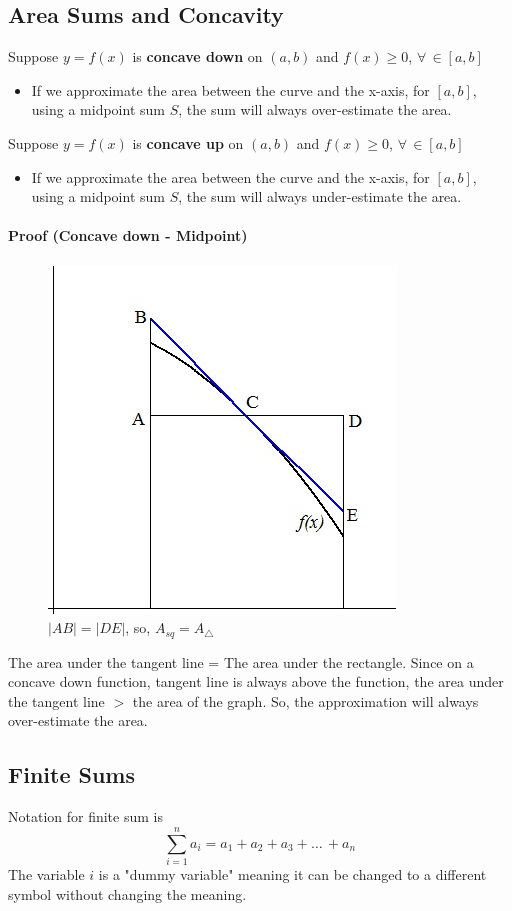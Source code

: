 \documentclass[12pt]{article}
\begin{document}
\subsection{Area Sums and Concavity}
Suppose $y = f(x)$ is \textbf{concave down} on $(a, b)$ and $f(x) \geq 0$, $\forall \, \in [a, b]$
\begin{itemize} 
    \item If we approximate the area between the curve and the x-axis, for $[a, b]$, using a midpoint sum $S$, 
    the sum will always over-estimate the area.
\end{itemize}

\noindent
Suppose $y = f(x)$ is \textbf{concave up} on $(a, b)$ and $f(x) \geq 0$, $\forall \, \in [a, b]$
\begin{itemize} 
    \item If we approximate the area between the curve and the x-axis, for $[a, b]$, using a midpoint sum  $S$, 
    the sum will always under-estimate the area.
\end{itemize}

\paragraph{Proof (Concave down - Midpoint)}
\begin{figure}[h!]
    \centering
    \includegraphics[width = 0.32\linewidth]{Images/overestimate concave down.jpg}
    \caption{$|AB| = |DE|$, so, $A_{sq} = A_{\triangle}$}
\end{figure}
The area under the tangent line = The area under the rectangle. Since on a concave down function, tangent line is always above the function, 
the area under the tangent line $>$ the area of the graph. So, the approximation will always over-estimate the area.
\subsection{Finite Sums}
Notation for finite sum is 
\[
    \sum_{i = 1}^n a_i = a_1 + a_2 + a_3 + \dots\, + a_n
\]
The variable $i$ is a "dummy variable" meaning it can be changed to a different symbol 
without changing the meaning.
\end{document}
